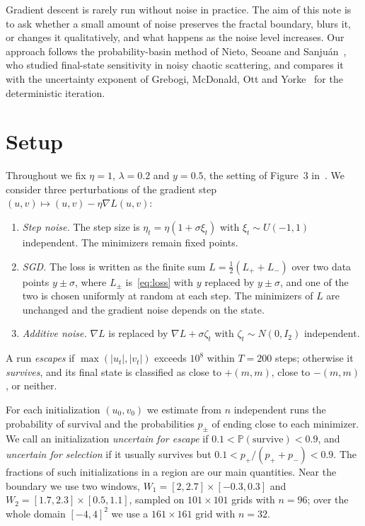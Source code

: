 \documentclass[11pt]{article}
\newcommand{\Prob}{\mathbb{P}}
\begin{document}
Gradient descent is rarely run without noise in practice. The aim of this note is to ask whether a small amount of noise preserves the fractal boundary, blurs it, or changes it qualitatively, and what happens as the noise level increases. Our approach follows the probability-basin method of Nieto, Seoane and Sanju\'an~\cite{nieto2021}, who studied final-state sensitivity in noisy chaotic scattering, and compares it with the uncertainty exponent of Grebogi, McDonald, Ott and Yorke~\cite{grebogi1983} for the deterministic iteration.

\section{Setup}

Throughout we fix $\eta=1$, $\lambda=0.2$ and $y=0.5$, the setting of Figure~3 in~\cite{liang2026}. We consider three perturbations of the gradient step $(u,v)\mapsto (u,v)-\eta\nabla L(u,v)$:
\begin{enumerate}
  \item \emph{Step noise.} The step size is $\eta_t=\eta(1+\sigma\xi_t)$ with $\xi_t\sim U(-1,1)$ independent. The minimizers remain fixed points.
  \item \emph{SGD.} The loss is written as the finite sum $L=\frac12(L_++L_-)$ over two data points $y\pm\sigma$, where $L_\pm$ is~\eqref{eq:loss} with $y$ replaced by $y\pm\sigma$, and one of the two is chosen uniformly at random at each step. The minimizers of $L$ are unchanged and the gradient noise depends on the state.
  \item \emph{Additive noise.} $\nabla L$ is replaced by $\nabla L+\sigma\zeta_t$ with $\zeta_t\sim N(0,I_2)$ independent.
\end{enumerate}
A run \emph{escapes} if $\max(|u_t|,|v_t|)$ exceeds $10^8$ within $T=200$ steps; otherwise it \emph{survives}, and its final state is classified as close to $+(m,m)$, close to $-(m,m)$, or neither.

For each initialization $(u_0,v_0)$ we estimate from $n$ independent runs the probability of survival and the probabilities $p_\pm$ of ending close to each minimizer. We call an initialization \emph{uncertain for escape} if $0.1<\Prob(\text{survive})<0.9$, and \emph{uncertain for selection} if it usually survives but $0.1<p_+/(p_++p_-)<0.9$. The fractions of such initializations in a region are our main quantities. Near the boundary we use two windows, $W_1=[2,2.7]\times[-0.3,0.3]$ and $W_2=[1.7,2.3]\times[0.5,1.1]$, sampled on $101\times101$ grids with $n=96$; over the whole domain $[-4,4]^2$ we use a $161\times161$ grid with $n=32$.
\end{document}
